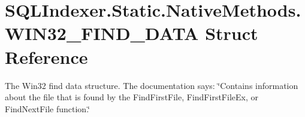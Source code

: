 \hypertarget{struct_s_q_l_indexer_1_1_static_1_1_native_methods_1_1_w_i_n32___f_i_n_d___d_a_t_a}{\section{S\-Q\-L\-Indexer.\-Static.\-Native\-Methods.\-W\-I\-N32\-\_\-\-F\-I\-N\-D\-\_\-\-D\-A\-T\-A Struct Reference}
\label{struct_s_q_l_indexer_1_1_static_1_1_native_methods_1_1_w_i_n32___f_i_n_d___d_a_t_a}
}


The Win32 find data structure. The documentation says\-: \char`\"{}\-Contains information about the file that is found by the Find\-First\-File, Find\-First\-File\-Ex, or Find\-Next\-File function.\char`\"{}  


